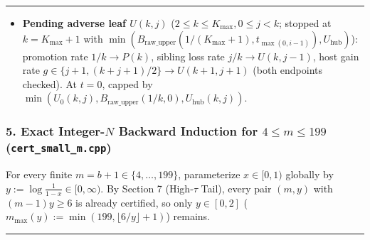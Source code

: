 \documentclass[11pt]{article}
\theoremstyle{remark}
\numberwithin{equation}{section}
\newenvironment{transcription}{\par\medskip\noindent\rule{\linewidth}{0.4pt}\par\nopagebreak}{\par\nopagebreak\noindent\rule{\linewidth}{0.4pt}\par\medskip}
\begin{document}
\begin{transcription}
\begin{enumerate}
\begin{itemize}
\item \textbf{Pending adverse leaf $U(k, j)$} ($2 \le k \le K_{\max}, 0 \le j < k$; stopped at $k = K_{\max}+1$ with $\min(B_{\mathrm{raw\_upper}}(1/(K_{\max}+1), t_{\max(0,i-1)}), U_{\mathrm{hub}})$): promotion rate $1/k \to P(k)$, sibling loss rate $j/k \to U(k, j-1)$, host gain rate $g \in \{j+1, (k+j+1)/2\} \to U(k+1, j+1)$ (both endpoints checked). At $t = 0$, capped by $\min(U_0(k, j), B_{\mathrm{raw\_upper}}(1/k, 0), U_{\mathrm{hub}}(k, j))$.
\end{itemize}
\end{enumerate}


\subsubsection*{5. Exact Integer-$N$ Backward Induction for $4 \le m \le 199$ (\texttt{cert\_small\_m.cpp})}

For every finite $m = b + 1 \in \{4, \dots, 199\}$, parameterize $x \in [0, 1)$ globally by $y := \log\frac{1}{1 - x} \in [0, \infty)$. By Section 7 (High-$\tau$ Tail), every pair $(m, y)$ with $(m - 1)y \ge 6$ is already certified, so only $y \in [0, 2]$ ($m_{\max}(y) := \min(199, \lfloor 6/y \rfloor + 1)$) remains.


\end{transcription}
\end{document}
